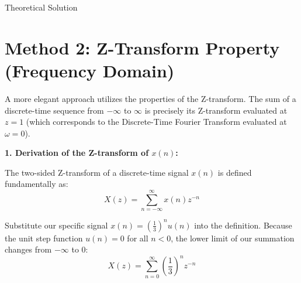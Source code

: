 \documentclass{beamer}
\begin{document}
\begin{frame}{Theoretical Solution}
\section{Method 2: Z-Transform Property (Frequency Domain)}
A more elegant approach utilizes the properties of the Z-transform. The sum of a discrete-time sequence from $-\infty$ to $\infty$ is precisely its Z-transform evaluated at $z = 1$ (which corresponds to the Discrete-Time Fourier Transform evaluated at $\omega = 0$).

\textbf{1. Derivation of the Z-transform of $x(n)$:}

The two-sided Z-transform of a discrete-time signal $x(n)$ is defined fundamentally as:
\begin{equation}
X(z) = \sum_{n=-\infty}^{\infty} x(n) z^{-n}
\end{equation}

Substitute our specific signal $x(n) = \left(\frac{1}{3}\right)^n u(n)$ into the definition. Because the unit step function $u(n) = 0$ for all $n < 0$, the lower limit of our summation changes from $-\infty$ to $0$:
\begin{equation}
X(z) = \sum_{n=0}^{\infty} \left(\frac{1}{3}\right)^n z^{-n}
\end{equation}


\end{frame}
\end{document}
